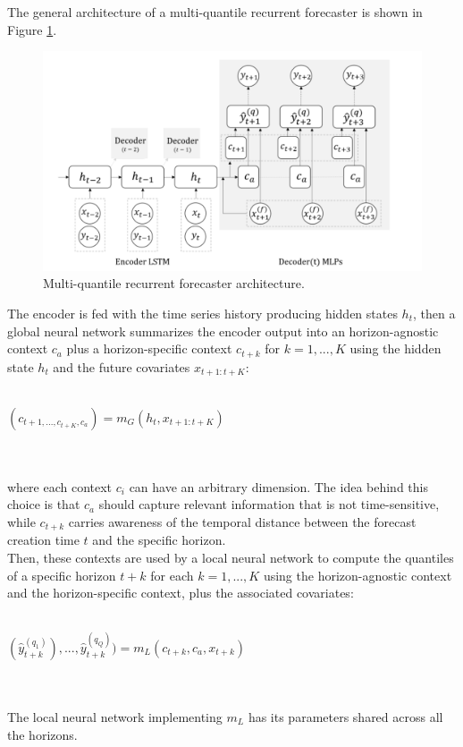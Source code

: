 \documentclass[a4paper, 12pt]{article} %
\begin{document}
	The general architecture of a multi-quantile recurrent forecaster is shown in Figure \ref{fig:mqforecaster}. 
	\begin{figure}
		\includegraphics[width=\linewidth]{img/mqcnn.png}
		\caption{Multi-quantile recurrent forecaster architecture.}
		\label{fig:mqforecaster}
	\end{figure}
	The encoder is fed with the time series history producing hidden states $h_t$,  then a global neural network summarizes the encoder output into an horizon-agnostic context $c_a$ plus a horizon-specific context $c_{t+k}$ for $k=1,...,K$ using the hidden state $h_t$ and the future covariates $x_{t+1:t+K}$:\\\\
	\centerline{
		$
		(c_{t+1, ..., c_{t+K}, c_a}) = m_G(h_t, x_{t+1:t+K})
		$
	}\\\\
	where each context $c_i$ can have an arbitrary dimension. The idea behind this choice is that $c_a$ should capture relevant information that is not time-sensitive, while $c_{t+k}$ carries awareness of the temporal distance between the forecast creation time $t$ and the specific horizon.\\ 
	Then, these contexts are used by a local neural network to compute the quantiles of a specific horizon $t+k$ for each $k=1,...,K$ using the horizon-agnostic context and the horizon-specific context, plus the associated covariates:\\\\
	\centerline{
		$
		(\hat{y}_{t+k}^{(q_1)}), ..., \hat{y}_{t+k}^{(q_Q)}) = m_L(c_{t+k}, c_a, x_{t+k})
		$
	}\\\\
	The local neural network implementing $m_L$ has its parameters shared across all the horizons.
	
\end{document}
